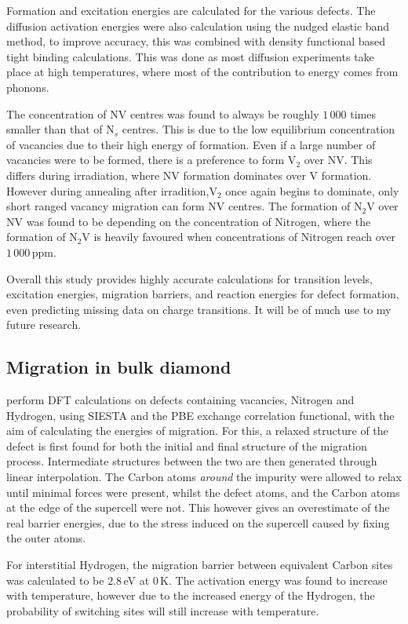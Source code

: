 \documentclass[10pt,a4paper,twocolumn,twoside]{extarticle}
\begin{document}
Formation and excitation energies are calculated for the various defects. The diffusion activation energies were also calculation using the nudged elastic band method, to improve accuracy, this was combined with density functional based tight binding calculations. This was done as most diffusion experiments take place at high temperatures, where most of the contribution to energy comes from phonons. 

The concentration of NV centres was found to always be roughly $1\,000$ times smaller than that of N$_s$ centres. This is due to the low equilibrium concentration of vacancies due to their high energy of formation. Even if a large number of vacancies were to be formed, there is a preference to form V$_2$ over NV. This differs during irradiation, where NV formation dominates over V formation. However during annealing after irradition,V$_2$ once again begins to dominate, only short ranged vacancy migration can form NV centres.
The formation of N$_2$V over NV was found to be depending on the concentration of Nitrogen, where the formation of N$_2$V is heavily favoured when concentrations of Nitrogen reach over $1\,000$\,ppm.

Overall this study provides highly accurate calculations for transition levels, excitation energies, migration barriers, and reaction energies for defect formation, even predicting missing data on charge transitions. It will be of much use to my future research.

\subsection{Migration in bulk diamond}
\textcite{butorac} perform DFT calculations on defects containing vacancies, Nitrogen and Hydrogen, using SIESTA and the PBE exchange correlation functional, with the aim of calculating the energies of migration. For this, a relaxed structure of the defect is first found for both the initial and final structure of the migration process. Intermediate structures between the two are then generated through linear interpolation. The Carbon atoms \emph{around} the impurity were allowed to relax until minimal forces were present, whilst the defect atoms, and the Carbon atoms at the edge of the supercell were not. This however gives an overestimate of the real barrier energies, due to the stress induced on the supercell caused by fixing the outer atoms.

For interstitial Hydrogen, the migration barrier between equivalent Carbon sites was calculated to be $2.8$\,eV at $0$\,K. The activation energy was found to increase with temperature, however due to the increased energy of the Hydrogen, the probability of switching sites will still increase with temperature.
\end{document}
